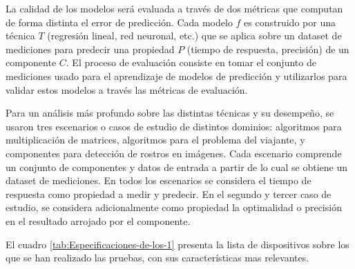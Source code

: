 La calidad de los modelos será evaluada a través de dos métricas
que computan de forma distinta el error de predicción. Cada modelo
$f$ es construido por una técnica \emph{$T$} (regresión lineal,
red neuronal, etc.) que se aplica sobre un dataset de mediciones para
predecir una propiedad $P$ (tiempo de respuesta, precisión) de un
componente $C$. El proceso de evaluación consiste en tomar el conjunto
de mediciones usado para el aprendizaje de modelos de predicción y
utilizarlos para validar estos modelos a través las métricas de evaluación. 

Para un análisis más profundo sobre las distintas técnicas y su desempeño,
se usaron tres escenarios o casos de estudio de distintos dominios:
algoritmos para multiplicación de matrices, algoritmos para el problema
del viajante, y componentes para detección de rostros en imágenes.
Cada escenario comprende un conjunto de componentes y datos de entrada
a partir de lo cual se obtiene un dataset de mediciones. En todos
los escenarios se considera el tiempo de respuesta como propiedad
a medir y predecir. En el segundo y tercer caso de estudio, se considera
adicionalmente como propiedad la optimalidad o precisión en el resultado
arrojado por el componente.

El cuadro \ref{tab:Especificaciones-de-los-1} presenta la lista de
dispositivos sobre los que se han realizado las pruebas, con sus características
mas relevantes.

\begin{table}[H]
\begin{doublespace}
\begin{centering}
\par\end{centering}
\end{doublespace}

\caption{Características de los dispositivos móviles utilizados.\label{tab:Especificaciones-de-los-1}}
\end{table}




